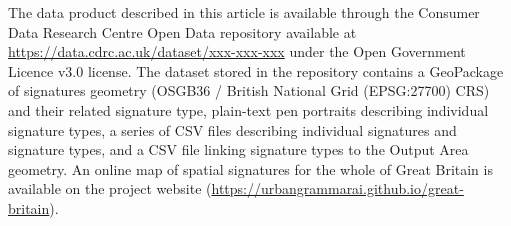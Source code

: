 
The data product described in this article is available through the Consumer Data
Research Centre Open Data repository available at
\hyperlink{https://data.cdrc.ac.uk/dataset/xxx-xxx-xxx}{https://data.cdrc.ac.uk/dataset/xxx-xxx-xxx}
under the Open Government Licence v3.0 license. The dataset stored in the repository
contains a GeoPackage of signatures geometry (OSGB36 / British National Grid
(EPSG:27700) CRS) and their related signature type, plain-text pen portraits describing individual
signature types, a series of CSV files describing individual signatures and signature
types, and a CSV file linking signature types to the Output Area geometry. An online map
of spatial signatures for the whole of Great Britain is available on the project website
(\hyperlink{https://urbangrammarai.github.io/great-britain}{https://urbangrammarai.github.io/great-britain}).